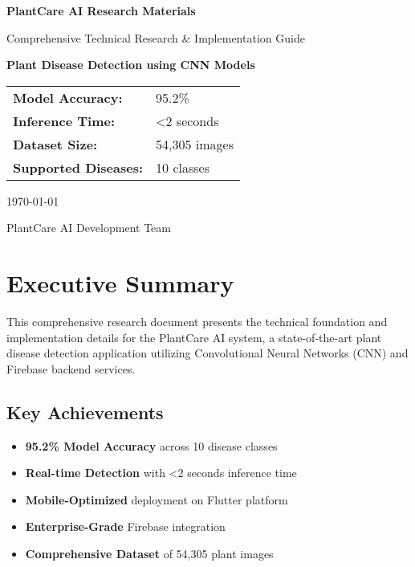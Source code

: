 \documentclass[12pt,a4paper]{article}
\begin{document}
\begin{titlepage}
    \centering
    \vspace*{2cm}
    
    {\Huge\bfseries\color{primaryblue} PlantCare AI Research Materials}
    
    \vspace{1cm}
    
    {\Large\color{darkgray} Comprehensive Technical Research \& Implementation Guide}
    
    \vspace{2cm}
    
    {\large\bfseries\color{secondarygreen} Plant Disease Detection using CNN Models}
    
    \vspace{1cm}
    
    {\large\color{darkgray} 
    \begin{tabular}{ll}
        \textbf{Model Accuracy:} & 95.2\% \\
        \textbf{Inference Time:} & <2 seconds \\
        \textbf{Dataset Size:} & 54,305 images \\
        \textbf{Supported Diseases:} & 10 classes
    \end{tabular}
    }
    
    \vfill
    
    {\large\color{darkgray} \today}
    
    \vspace{1cm}
    
    {\small\color{darkgray} PlantCare AI Development Team}
\end{titlepage}

\tableofcontents
\newpage

\section{Executive Summary}

This comprehensive research document presents the technical foundation and implementation details for the PlantCare AI system, a state-of-the-art plant disease detection application utilizing Convolutional Neural Networks (CNN) and Firebase backend services.

\subsection{Key Achievements}
\begin{itemize}[leftmargin=2em]
    \item \textbf{95.2\% Model Accuracy} across 10 disease classes
    \item \textbf{Real-time Detection} with <2 seconds inference time
    \item \textbf{Mobile-Optimized} deployment on Flutter platform
    \item \textbf{Enterprise-Grade} Firebase integration
    \item \textbf{Comprehensive Dataset} of 54,305 plant images
\end{itemize}
\end{document}
